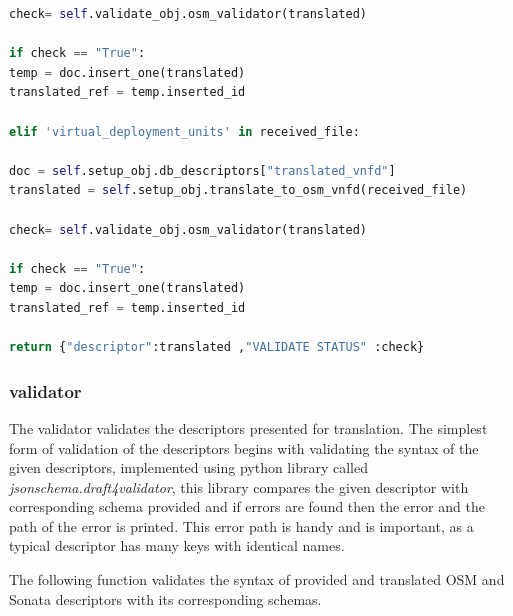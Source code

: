 \begin{lstlisting}[language=Python,caption= Translating descriptor between Pishahang and OSM, label=lis:toSOnata]
check= self.validate_obj.osm_validator(translated)

if check == "True":
temp = doc.insert_one(translated)
translated_ref = temp.inserted_id

elif 'virtual_deployment_units' in received_file:

doc = self.setup_obj.db_descriptors["translated_vnfd"]
translated = self.setup_obj.translate_to_osm_vnfd(received_file)

check= self.validate_obj.osm_validator(translated)

if check == "True":
temp = doc.insert_one(translated)
translated_ref = temp.inserted_id

return {"descriptor":translated ,"VALIDATE STATUS" :check}
\end{lstlisting}

\subsubsection{validator}

The validator validates the descriptors presented for translation. The simplest form of validation of the descriptors begins with validating the syntax of the given descriptors, implemented using python library called \textit{jsonschema.draft4validator}, this library compares the given descriptor with corresponding schema provided and if errors are found then the error and the path of the error is printed. This error path is handy and is important, as a typical descriptor has many keys with identical names.

The following function validates the syntax of provided and translated OSM and Sonata descriptors with its corresponding schemas.

